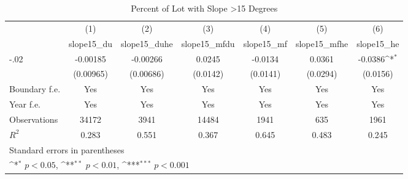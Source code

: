 \begin{table}[htbp]\centering
\def\sym#1{\ifmmode^{#1}\else\(^{#1}\)\fi}
\caption{Percent of Lot with Slope >15 Degrees}
\begin{tabular}{l*{6}{c}}
\hline\hline
                    &\multicolumn{1}{c}{(1)}&\multicolumn{1}{c}{(2)}&\multicolumn{1}{c}{(3)}&\multicolumn{1}{c}{(4)}&\multicolumn{1}{c}{(5)}&\multicolumn{1}{c}{(6)}\\
                    &\multicolumn{1}{c}{slope15\_du}&\multicolumn{1}{c}{slope15\_duhe}&\multicolumn{1}{c}{slope15\_mfdu}&\multicolumn{1}{c}{slope15\_mf}&\multicolumn{1}{c}{slope15\_mfhe}&\multicolumn{1}{c}{slope15\_he}\\
\hline
-.02                &    -0.00185         &    -0.00266         &      0.0245         &     -0.0134         &      0.0361         &     -0.0386\sym{*}  \\
                    &   (0.00965)         &   (0.00686)         &    (0.0142)         &    (0.0141)         &    (0.0294)         &    (0.0156)         \\
[1em]
Boundary f.e.       &         Yes         &         Yes         &         Yes         &         Yes         &         Yes         &         Yes         \\
[1em]
Year f.e.           &         Yes         &         Yes         &         Yes         &         Yes         &         Yes         &         Yes         \\
\hline
Observations        &       34172         &        3941         &       14484         &        1941         &         635         &        1961         \\
\(R^{2}\)           &       0.283         &       0.551         &       0.367         &       0.645         &       0.483         &       0.245         \\
\hline\hline
\multicolumn{7}{l}{\footnotesize Standard errors in parentheses}\\
\multicolumn{7}{l}{\footnotesize \sym{*} \(p<0.05\), \sym{**} \(p<0.01\), \sym{***} \(p<0.001\)}\\
\end{tabular}
\end{table}

